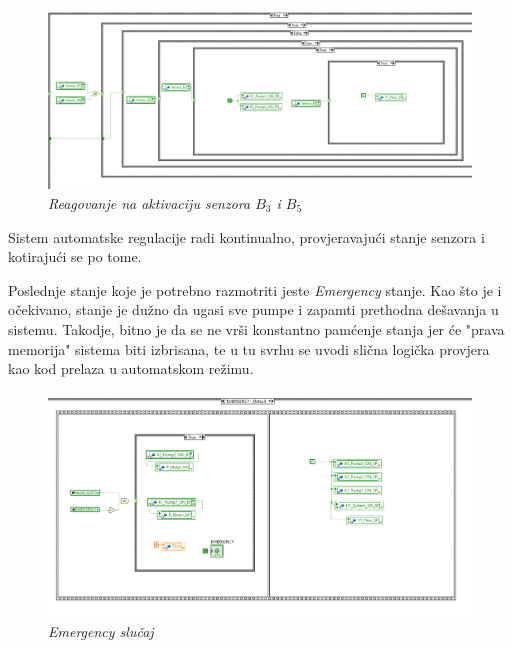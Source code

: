\documentclass[12pt, titlepage]{article}
\begin{document}
                \begin{figure}[ht]
                    \centering
                    \includegraphics[width=\textwidth]{Slike/HAND_AUTO.vi SENSORB3B5.png}
                    \caption{\textit{Reagovanje na aktivaciju senzora $B_3$ i $B_5$}}
                \end{figure}

                Sistem automatske regulacije radi kontinualno, provjeravajući stanje senzora i kotirajući se po tome.

                \newpage

                Poslednje stanje koje je potrebno razmotriti jeste \textit{Emergency} stanje.
                Kao što je i očekivano, stanje je dužno da ugasi sve pumpe i zapamti prethodna dešavanja 
                u sistemu. Takodje, bitno je da se ne vrši konstantno pamćenje stanja jer će "prava memorija"
                sistema biti izbrisana, te u tu svrhu se uvodi slična logička provjera kao kod prelaza u 
                automatskom režimu. 

                \begin{figure}[ht]
                    \centering
                    \includegraphics[width=\textwidth]{Slike/HAND_AUTO.vi EMERGENCY.png}
                    \caption{\textit{Emergency slučaj}}
                \end{figure}
\end{document}
